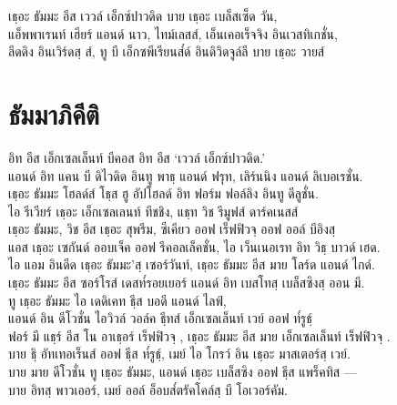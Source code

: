 \begin{thaitrans}
เธฺอะ ธัมมะ อีส เววล์ เอ็กซ์ปาวดิด บาย เธฺอะ เบล็สเซ็ด  วัน,\\
แอ็พพาเรนท์ เฮียร์ แอนด์ นาว, ไทม์เลสส์, เอ็นเคอเร็จจิง อินเวสทิเกชั่น,\\
ลีดดิง อินเวิร์ดสฺ ส์, ทู บี เอ็กซพีเรียนส๎ด์ อินดิวิดจูล์ลี บาย เธฺอะ วายส์\\
\end{thaitrans}

\chapter{ธัมมาภิคีติ}

\begin{leader}
\end{leader}

\begin{thaitrans}
อิท อีส เอ็กเซลเล็นท์ บีคอส อิท อีส ‘เววล์ เอ็กซ์ปาวดิด.’\\
แอนด์ อิท แคน บี ดิไวดิด อินทู พาธฺ แอนด์ ฟรุท, เลิร์นนิง แอนด์ ลิเบอเรชั่น.\\
เธฺอะ ธัมมะ โฮลด์ส์ โธฺส ฮู อัปโฮลด์ อิท ฟอร์ม ฟอล์ลิง อินทู ดีลูชั่น.\\
ไอ รีเวียร์ เธฺอะ เอ็กเซลเลนท์ ทีชชิง, แธฺท วิช รีมูฟส์ ดาร์คเนสส์\\
เธฺอะ ธัมมะ, วิช อีส เธฺอะ สุพรีม, ซีเคียว  ออฟ เร็ฟฟิวจฺ  ออฟ ออล์ บีอิงสฺ\\
แอส เธฺอะ เซกันด์ ออบเจ็ค ออฟ รีคอลเล็คชั่น, ไอ เว็นเนอเรท อิท วิธฺ บาวด์ เฮด.\\
ไอ แอม อินดีด เธฺอะ ธัมมะ’สฺ  เซอร์วันท์, เธฺอะ ธัมมะ อีส มาย โลร์ด แอนด์ ไกด์.\\
เธฺอะ ธัมมะ อีส ซอร์โรส์ เดสท๎รอยเยอร์ แอนด์ อิท เบสโทสฺ  เบล็สซิงสฺ  ออน มี.\\
ทู เธฺอะ ธัมมะ ไอ เดดิเคท ธฺีส บอดี แอนด์ ไลฟ์,\\
แอนด์ อิน ดีโวชั่น ไอวิวล์ วอล์ค ธฺีทส์  เอ็กเซลเล็นท์ เวย์ ออฟ ท๎รูธฺ์\\
ฟอร์ มี แธฺร์ อีส โน อาเธฺอร์ เร็ฟฟิวจฺ , เธฺอะ ธัมมะ อีส มาย เอ็กเซลเล็นท์ เร็ฟฟิวจฺ .\\
บาย ธฺิ  อัทเทอเร็นส์ ออฟ ธฺีส ท๎รูธฺ์, เมย์ ไอ โกรว์ อิน เธฺอะ มาสเตอร์สฺ  เวย์.\\
บาย มาย ดีโวชั่น ทู เธฺอะ ธัมมะ, แอนด์ เธฺอะ เบล็สซิง ออฟ ธฺีส แพร็คทิส —\\
บาย อิทสฺ  พาวเออร์, เมย์ ออล์ อ็อบส๎ตรัคโคล์สฺ บี โอเวอร์คัม.\\
\end{thaitrans}

